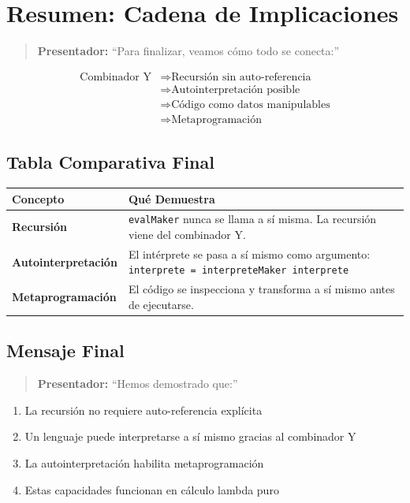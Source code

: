\documentclass[12pt]{article}
\begin{document}
\newpage
\section{Resumen: Cadena de Implicaciones}

\begin{quote}
\textbf{Presentador:} ``Para finalizar, veamos cómo todo se conecta:''
\end{quote}

\begin{align*}
\text{Combinador Y} &\Rightarrow \text{Recursión sin auto-referencia} \\
&\Rightarrow \text{Autointerpretación posible} \\
&\Rightarrow \text{Código como datos manipulables} \\
&\Rightarrow \text{Metaprogramación}
\end{align*}

\subsection*{Tabla Comparativa Final}

\begin{center}
\begin{tabular}{|l|p{8cm}|}
\hline
\textbf{Concepto} & \textbf{Qué Demuestra} \\
\hline
\textbf{Recursión} & \texttt{evalMaker} nunca se llama a sí misma. La recursión viene del combinador Y. \\
\hline
\textbf{Autointerpretación} & El intérprete se pasa a sí mismo como argumento: \texttt{interprete = interpreteMaker interprete} \\
\hline
\textbf{Metaprogramación} & El código se inspecciona y transforma a sí mismo antes de ejecutarse. \\
\hline
\end{tabular}
\end{center}

\subsection*{Mensaje Final}

\begin{quote}
\textbf{Presentador:} ``Hemos demostrado que:''
\end{quote}

\begin{enumerate}
\item La recursión no requiere auto-referencia explícita
\item Un lenguaje puede interpretarse a sí mismo gracias al combinador Y
\item La autointerpretación habilita metaprogramación
\item Estas capacidades funcionan en cálculo lambda puro
\end{enumerate}
\end{document}
